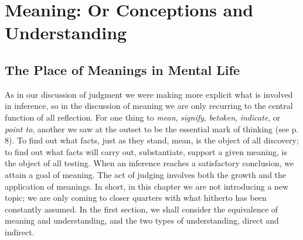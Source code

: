 \documentclass[letterpaper]{book}
\begin{document}
\chapter{Meaning: Or Conceptions and Understanding}

\section{The Place of Meanings in Mental Life}


As in our discussion of judgment we were making more explicit what is
involved in inference, so in the discussion of meaning we are only
recurring to the central function of all reflection. For one thing to
\emph{mean}, \emph{signify}, \emph{betoken}, \emph{indicate}, or
\emph{point to}, another we saw at the outset to be the essential mark
of thinking (see p. 8). To find out what facts, just as they stand,
mean, is the object of all discovery; to find out what facts will carry
out, substantiate, support a given meaning, is the object of all
testing. When an inference reaches a satisfactory conclusion, we attain
a goal of meaning. The act of judging involves both the growth and the
application of meanings. In short, in this chapter we are not
introducing a new topic; we are only coming to closer quarters with what
hitherto has been constantly assumed. In the first section, we shall
consider the equivalence of meaning and understanding, and the two types
of understanding, direct and indirect.


\end{document}
